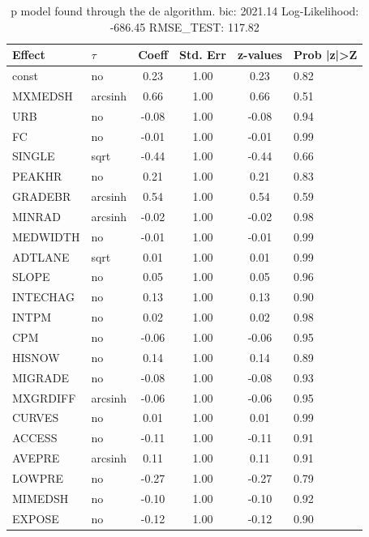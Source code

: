 \begin{table}
	\caption{p model found through the de algorithm. bic: 2021.14 Log-Likelihood: -686.45 RMSE_TEST: 117.82}
	\begin{center}
		\begin{tabular}{|l|l|c|c|c|l|}
			\hline
			Effect & $\tau$ & Coeff & Std. Err & z-values & Prob |z|>Z \\
			\hline
			const & no & 0.23 & 1.00 & 0.23 & 0.82 \\
			\hline
			MXMEDSH & arcsinh & 0.66 & 1.00 & 0.66 & 0.51 \\
			\hline
			URB & no & -0.08 & 1.00 & -0.08 & 0.94 \\
			\hline
			FC & no & -0.01 & 1.00 & -0.01 & 0.99 \\
			\hline
			SINGLE & sqrt & -0.44 & 1.00 & -0.44 & 0.66 \\
			\hline
			PEAKHR & no & 0.21 & 1.00 & 0.21 & 0.83 \\
			\hline
			GRADEBR & arcsinh & 0.54 & 1.00 & 0.54 & 0.59 \\
			\hline
			MINRAD & arcsinh & -0.02 & 1.00 & -0.02 & 0.98 \\
			\hline
			MEDWIDTH & no & -0.01 & 1.00 & -0.01 & 0.99 \\
			\hline
			ADTLANE & sqrt & 0.01 & 1.00 & 0.01 & 0.99 \\
			\hline
			SLOPE & no & 0.05 & 1.00 & 0.05 & 0.96 \\
			\hline
			INTECHAG & no & 0.13 & 1.00 & 0.13 & 0.90 \\
			\hline
			INTPM & no & 0.02 & 1.00 & 0.02 & 0.98 \\
			\hline
			CPM & no & -0.06 & 1.00 & -0.06 & 0.95 \\
			\hline
			HISNOW & no & 0.14 & 1.00 & 0.14 & 0.89 \\
			\hline
			MIGRADE & no & -0.08 & 1.00 & -0.08 & 0.93 \\
			\hline
			MXGRDIFF & arcsinh & -0.06 & 1.00 & -0.06 & 0.95 \\
			\hline
			CURVES & no & 0.01 & 1.00 & 0.01 & 0.99 \\
			\hline
			ACCESS & no & -0.11 & 1.00 & -0.11 & 0.91 \\
			\hline
			AVEPRE & arcsinh & 0.11 & 1.00 & 0.11 & 0.91 \\
			\hline
			LOWPRE & no & -0.27 & 1.00 & -0.27 & 0.79 \\
			\hline
			MIMEDSH & no & -0.10 & 1.00 & -0.10 & 0.92 \\
			\hline
			EXPOSE & no & -0.12 & 1.00 & -0.12 & 0.90 \\

\end{tabular}
\end{center}
\end{table}
